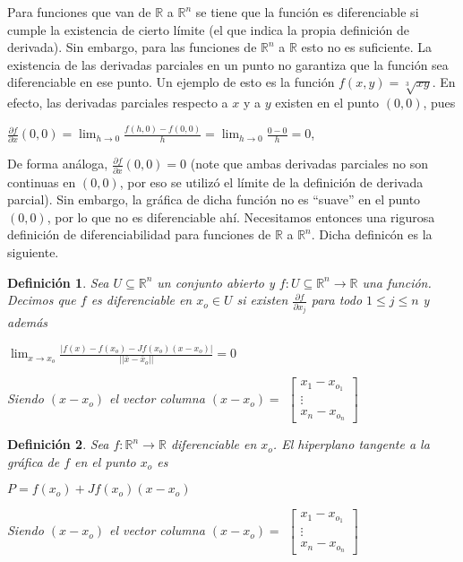 \documentclass{book}
\newtheorem{definition}{Definición}[section]
\begin{document}
Para funciones que van de $\mathbb{R}$ a $\mathbb{R}^n$ se tiene que la función es diferenciable si cumple la existencia de cierto límite (el que indica la propia definición de derivada). Sin embargo, para las funciones de $\mathbb{R}^n$ a $\mathbb{R}$ esto no es suficiente. La existencia de las derivadas parciales en un punto no garantiza que la función sea diferenciable en ese punto. Un ejemplo de esto es la función $f(x,y)=\sqrt[3]{xy}$. En efecto, las derivadas parciales respecto a $x$ y a $y$ existen en el punto $(0,0)$, pues
\begin{center}
    $\frac{\partial f}{\partial x}(0,0)=\displaystyle \lim_{h \to 0}\frac{f(h,0)-f(0,0)}{h}=\lim_{h \to 0}\frac{0-0}{h}=0$,
\end{center}
De forma análoga, $\frac{\partial f}{\partial x}(0,0)=0$ (note que ambas derivadas parciales no son continuas en $(0,0)$, por eso se utilizó el límite de la definición de derivada parcial). Sin embargo, la gráfica de dicha función no es ``suave'' en el punto $(0,0)$, por lo que no es diferenciable ahí. Necesitamos entonces una rigurosa definición de diferenciabilidad para funciones de $\mathbb{R}$ a $\mathbb{R}^n$. Dicha definicón es la siguiente.
\begin{definition}
Sea $U \subseteq \mathbb{R}^n$ un conjunto abierto y  $f:U \subseteq \mathbb{R}^n \rightarrow \mathbb{R}$ una función. Decimos que $f$ es diferenciable en $x_o \in U$ si existen $\frac{\partial f}{\partial x_j}$ para todo $1 \leq j \leq n$ y además
\begin{center}
$\displaystyle \lim_{x \to x_o}\frac{|f(x)-f(x_o)-Jf(x_o)(x-x_o)|}{||\bar{x}-\bar{x}_o||}=0$
\end{center}
Siendo $(x-x_o)$ el vector columna $(x-x_o)=$
$\begin{bmatrix}
  x_1-x_{o_1} \\
  \vdots \\
  x_n-x_{o_n}
\end{bmatrix}$
\end{definition}

\begin{definition}
Sea $f:\mathbb{R}^n \rightarrow \mathbb{R}$ diferenciable en $x_o$. El hiperplano tangente a la gráfica de $f$ en el punto $x_o$ es
\begin{center}
$P=f(x_o)+Jf(x_o)(x-x_o)$
\end{center}
Siendo $(x-x_o)$ el vector columna $(x-x_o)=$
$\begin{bmatrix}
  x_1-x_{o_1} \\
  \vdots \\
  x_n-x_{o_n}
\end{bmatrix}$
\end{definition}
\end{document}
